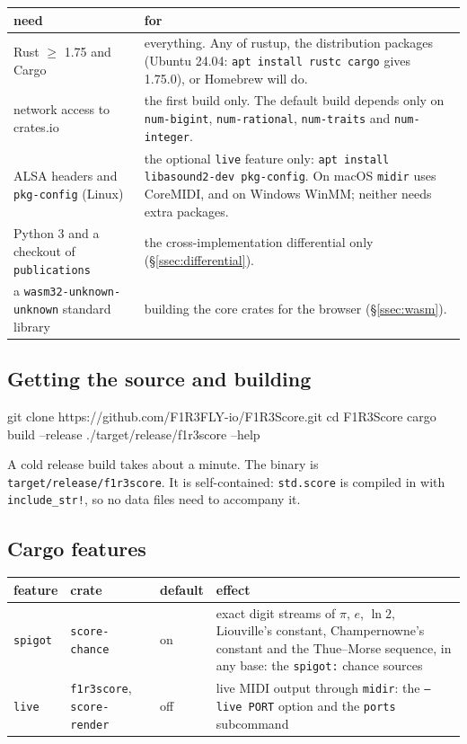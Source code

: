 \documentclass[11pt,a4paper]{article}
\newcommand{\ttx}[1]{\texttt{#1}}
\begin{document}
\begin{center}
\small
\begin{tabularx}{\linewidth}{@{}l>{\raggedright\arraybackslash}X@{}}
\toprule
need & for \\
\midrule
Rust $\geq$ 1.75 and Cargo & everything. Any of rustup, the distribution
  packages (Ubuntu 24.04: \ttx{apt install rustc cargo} gives 1.75.0), or
  Homebrew will do. \\
network access to crates.io & the first build only. The default build
  depends only on \ttx{num-bigint}, \ttx{num-rational}, \ttx{num-traits} and
  \ttx{num-integer}. \\
ALSA headers and \ttx{pkg-config} (Linux) & the optional \ttx{live} feature
  only: \ttx{apt install libasound2-dev pkg-config}. On macOS \ttx{midir} uses
  CoreMIDI, and on Windows WinMM; neither needs extra packages. \\
Python 3 and a checkout of \ttx{publications} & the cross-implementation
  differential only (\S\ref{ssec:differential}). \\
a \ttx{wasm32-unknown-unknown} standard library & building the core crates
  for the browser (\S\ref{ssec:wasm}). \\
\bottomrule
\end{tabularx}
\end{center}

\subsection{Getting the source and building}

\begin{shell}
git clone https://github.com/F1R3FLY-io/F1R3Score.git
cd F1R3Score
cargo build --release
./target/release/f1r3score --help
\end{shell}

\noindent A cold release build takes about a minute. The binary is
\ttx{target/release/f1r3score}. It is self-contained: \ttx{std.score} is
compiled in with \ttx{include\_str!}, so no data files need to accompany it.

\subsection{Cargo features}

\begin{center}
\small
\begin{tabularx}{\linewidth}{@{}lll>{\raggedright\arraybackslash}X@{}}
\toprule
feature & crate & default & effect \\
\midrule
\ttx{spigot} & \ttx{score-chance} & on & exact digit streams of
  $\pi$, $e$, $\ln 2$, Liouville's constant, Champernowne's constant and the
  Thue--Morse sequence, in any base: the \ttx{spigot:} chance sources \\
\ttx{live} & \ttx{f1r3score}, \ttx{score-render} & off & live MIDI output
  through \ttx{midir}: the \ttx{--live PORT} option and the \ttx{ports}
  subcommand \\
\bottomrule
\end{tabularx}
\end{center}
\end{document}
